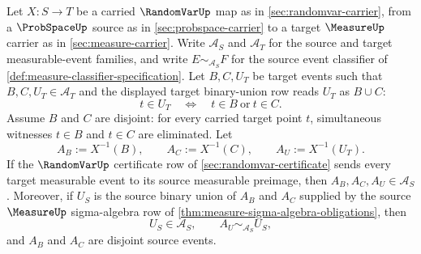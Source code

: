 \begin{theorem}
\label{thm:randomvar-preimage-disjoint-binary-union-exactness}
Let $X:S\to T$ be a carried $\RandomVarUp$ map as in \autoref{sec:randomvar-carrier}, from a $\ProbSpaceUp$ source as in \autoref{sec:probspace-carrier} to a target $\MeasureUp$ carrier as in \autoref{sec:measure-carrier}. Write $\mathcal{A}_S$ and $\mathcal{A}_T$ for the source and target measurable-event families, and write $E\sim_{\mathcal{A}_S}F$ for the source event classifier of \autoref{def:measure-classifier-specification}. Let $B,C,U_T$ be target events such that $B,C,U_T\in\mathcal{A}_T$ and the displayed target binary-union row reads $U_T$ as $B\cup C$:
$$
t\in U_T\quad\Longleftrightarrow\quad t\in B\ \text{or}\ t\in C.
$$
Assume $B$ and $C$ are disjoint: for every carried target point $t$, simultaneous witnesses $t\in B$ and $t\in C$ are eliminated. Let
$$
A_B:=X^{-1}(B),\qquad A_C:=X^{-1}(C),\qquad A_U:=X^{-1}(U_T).
$$
If the $\RandomVarUp$ certificate row of \autoref{sec:randomvar-certificate} sends every target measurable event to its source measurable preimage, then $A_B,A_C,A_U\in\mathcal{A}_S$. Moreover, if $U_S$ is the source binary union of $A_B$ and $A_C$ supplied by the source $\MeasureUp$ sigma-algebra row of \autoref{thm:measure-sigma-algebra-obligations}, then
$$
U_S\in\mathcal{A}_S,\qquad A_U\sim_{\mathcal{A}_S}U_S,
$$
and $A_B$ and $A_C$ are disjoint source events.
\end{theorem}
